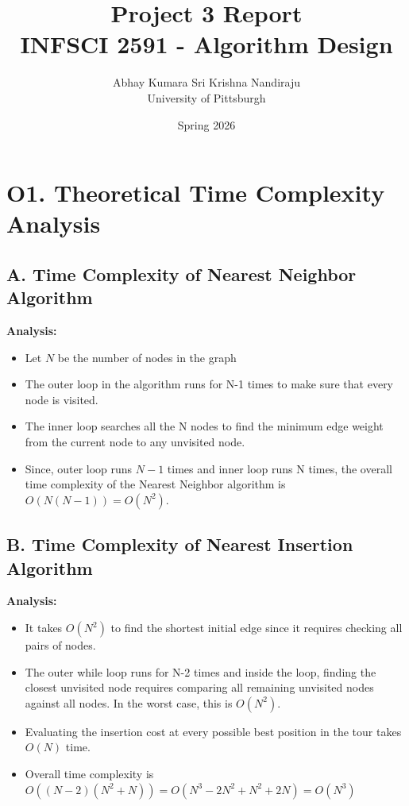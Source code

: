 \documentclass[11pt, a4paper]{article}
\title{\textbf{Project 3 Report}\\ \large INFSCI 2591 - Algorithm Design}
\author{Abhay Kumara Sri Krishna Nandiraju \\ University of Pittsburgh}
\date{Spring 2026}
\begin{document}
\maketitle


\section{O1. Theoretical Time Complexity Analysis}

\subsection{A. Time Complexity of Nearest Neighbor Algorithm}

\textbf{Analysis:} 
\begin{itemize}
  \item Let $N$ be the number of nodes in the graph
  \item The outer loop in the algorithm runs for N-1 times to make sure that every node is visited.
  \item The inner loop searches all the N nodes to find the minimum edge weight from the current node to any unvisited node.
  \item Since, outer loop runs $N-1$ times and inner loop runs N times, the overall time complexity of the Nearest Neighbor algorithm is $O(N(N-1))=O(N^2)$.
\end{itemize}

\subsection{B. Time Complexity of Nearest Insertion Algorithm}

\textbf{Analysis:} 
\begin{itemize}
  \item It takes $O(N^2)$ to find the shortest initial edge since it requires checking all pairs of nodes.
  \item The outer while loop runs for N-2 times and inside the loop, finding the closest unvisited node
  requires comparing all remaining unvisited nodes against all nodes. In the worst case, this is $O(N^2)$.
  \item Evaluating the insertion cost at every possible best position in the tour takes $O(N)$ time.
  \item Overall time complexity is $O((N-2)(N^2 + N)) = O(N^3-2N^2 +N^2 +2N) = O(N^3)$
\end{itemize}
\end{document}
